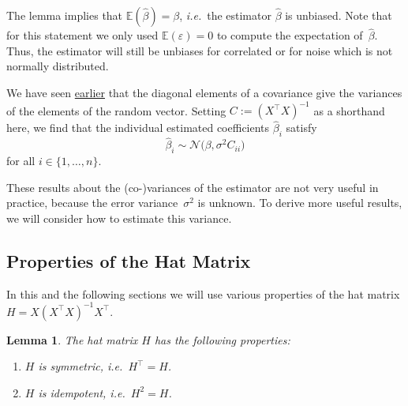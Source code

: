 \documentclass[
  a4paper,
]{article}
\providecommand{\tightlist}{%
  \setlength{\itemsep}{0pt}\setlength{\parskip}{0pt}}
\newtheorem{lemma}{Lemma}[section]
\theoremstyle{definition}
\theoremstyle{definition}
\theoremstyle{definition}
\theoremstyle{definition}
\theoremstyle{remark}
\begin{document}
The lemma implies that \(\mathbb{E}(\hat\beta) = \beta\), \emph{i.e.}~the estimator
\(\hat\beta\) is unbiased. Note that for this statement we only used \(\mathbb{E}(\varepsilon) = 0\) to compute the expectation of~\(\hat\beta\). Thus, the estimator will still
be unbiases for correlated or for noise which is not normally distributed.

We have seen \protect\hyperlink{eq:Cov-diag-elem}{earlier} that the diagonal elements
of a covariance give the variances of the elements of the random vector.
Setting \(C := (X^\top X)^{-1}\) as a shorthand here, we find that the
individual estimated coefficients \(\hat\beta_i\) satisfy
\begin{equation}
  \hat\beta_i
  \sim \mathcal{N}\bigl( \beta, \sigma^2 C_{ii} \bigr)  \label{eq:beta-hat-i}
\end{equation}
for all \(i \in \{1, \ldots, n\}\).

These results about the (co-)variances of the estimator are not very
useful in practice, because the error variance~\(\sigma^2\) is unknown.
To derive more useful results, we will consider how to estimate this
variance.

\hypertarget{hat-matrix}{%
\subsection{Properties of the Hat Matrix}\label{hat-matrix}}

In this and the following sections we will use various
properties of the hat matrix \(H = X (X^\top X)^{-1} X^\top\).

\begin{lemma}

The hat matrix \(H\) has the following properties:

\begin{enumerate}
\def\labelenumi{\arabic{enumi})}
\tightlist
\item
  \(H\) is symmetric, \emph{i.e.}~\(H^\top = H\).
\item
  \(H\) is idempotent, \emph{i.e.}~\(H^2 = H\).
\end{enumerate}

\end{lemma}
\end{document}
